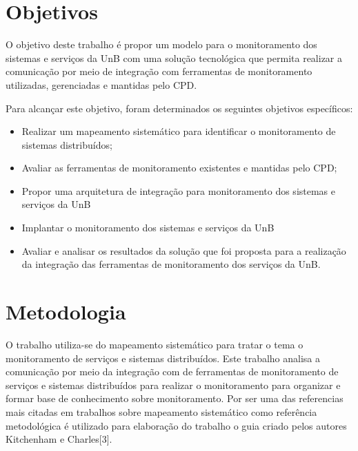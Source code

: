 
\section{Objetivos}
\label{objetivos}

O objetivo deste trabalho é propor um modelo para o monitoramento dos sistemas e serviços da \acrfull{UnB} com uma solução tecnológica que permita realizar a comunicação por meio de integração com ferramentas de monitoramento utilizadas, gerenciadas e mantidas pelo \acrfull{CPD}.

Para alcançar este objetivo, foram determinados os seguintes objetivos específicos:

\begin{itemize}
	 
\item Realizar um mapeamento sistemático para identificar o monitoramento
de sistemas distribuídos;

\item Avaliar as ferramentas de monitoramento existentes e mantidas pelo \acrshort{CPD};

\item Propor uma arquitetura de integração para monitoramento dos sistemas e serviços da \acrshort{UnB}

\item Implantar o monitoramento dos sistemas e serviços da \acrshort{UnB}

\item Avaliar e analisar os resultados da solução que foi proposta para a realização da integração das ferramentas de monitoramento dos serviços da \acrshort{UnB}. 

\end{itemize}

\section{Metodologia}

O trabalho utiliza-se do mapeamento sistemático para tratar o tema o monitoramento de serviços e sistemas distribuídos. Este trabalho analisa a comunicação por meio da integração com de ferramentas de monitoramento de serviços e sistemas distribuídos para realizar o monitoramento para organizar e formar base de conhecimento sobre monitoramento. Por ser uma das referencias mais citadas em trabalhos sobre mapeamento sistemático  como referência metodológica é utilizado para elaboração do trabalho o guia criado pelos autores Kitchenham e Charles[3].


